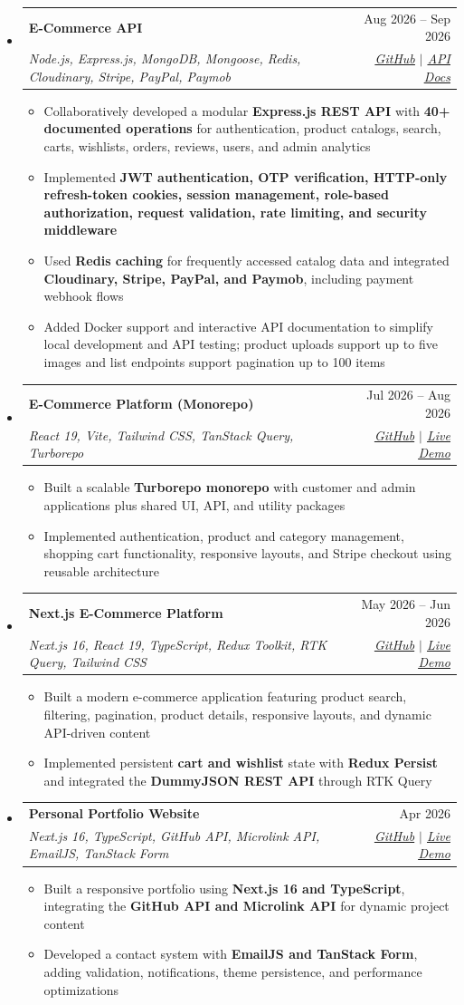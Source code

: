 \documentclass[letterpaper,11pt]{article}
\makeatletter
\newcommand{\resumeItem}[1]{ \item\small{ {#1 \vspace{-2pt}} } }
\newcommand{\resumeSubheading}[4]{
  \vspace{-2pt}\item
  \begin{tabular*}{0.97\textwidth}[t]{l@{\extracolsep{\fill}}r} \textbf{#1} & #2
  \\ \textit{\small#3} & \textit{\small #4} \\ \end{tabular*}\vspace{-7pt}
}
\newcommand{\resumeSubHeadingListStart}{\begin{itemize}[
    leftmargin=0.15in,
    label={}
  ]}
\newcommand{\resumeSubHeadingListEnd}{\end{itemize}}
\newcommand{\resumeItemListStart}{\begin{itemize}}
\newcommand{\resumeItemListEnd}{\end{itemize}\vspace{-5pt}}
\makeatother
\begin{document}
\resumeSubHeadingListStart
\resumeSubheading
{\textbf{E-Commerce API}}{Aug 2026 -- Sep 2026}
{\emph{
    Node.js, Express.js, MongoDB, Mongoose, Redis, Cloudinary, Stripe, PayPal,
    Paymob
  }}{\href{https://github.com/team-5-backend/e-commerce-api}{\underline{GitHub}}
  $|$
  \href{https://e-commerce-api-blond-eta.vercel.app/api/v1/docs}{\underline{
      API Docs
    }}}
\resumeItemListStart
\resumeItem{Collaboratively developed a modular \textbf{Express.js REST API}
  with \textbf{40+ documented operations} for authentication, product catalogs,
  search, carts, wishlists, orders, reviews, users, and admin analytics}
\resumeItem{Implemented
  \textbf{
    JWT authentication, OTP verification, HTTP-only refresh-token cookies,
    session management, role-based authorization, request validation, rate
    limiting, and security middleware
  }}
\resumeItem{Used \textbf{Redis caching} for frequently accessed catalog data and
  integrated \textbf{Cloudinary, Stripe, PayPal, and Paymob}, including payment
  webhook flows}
\resumeItem{Added Docker support and interactive API documentation to simplify
  local development and API testing; product uploads support up to five images
  and list endpoints support pagination up to 100 items}
\resumeItemListEnd
\resumeSubheading
{\textbf{E-Commerce Platform (Monorepo)}}{Jul 2026 -- Aug 2026}
{\emph{
    React 19, Vite, Tailwind CSS, TanStack Query, Turborepo
  }}{\href{https://github.com/team-9-frontend/e-commerce}{\underline{GitHub}}
  $|$
  \href{https://e-commerce-store-mu-eight.vercel.app/}{\underline{Live Demo}}}
\resumeItemListStart
\resumeItem{Built a scalable \textbf{Turborepo monorepo} with customer and admin
  applications plus shared UI, API, and utility packages}
\resumeItem{Implemented authentication, product and category management,
  shopping cart functionality, responsive layouts, and Stripe checkout using
  reusable architecture}
\resumeItemListEnd
\resumeSubheading
{\textbf{Next.js E-Commerce Platform}}{May 2026 -- Jun 2026}
{\emph{
    Next.js 16, React 19, TypeScript, Redux Toolkit, RTK Query, Tailwind CSS
  }}{\href{https://github.com/ziad-wdev/Store}{\underline{GitHub}} $|$
  \href{https://store-two-mu.vercel.app/}{\underline{Live Demo}}}
\resumeItemListStart
\resumeItem{Built a modern e-commerce application featuring product search,
  filtering, pagination, product details, responsive layouts, and dynamic
  API-driven content}
\resumeItem{Implemented persistent \textbf{cart and wishlist} state with
  \textbf{Redux Persist} and integrated the \textbf{DummyJSON REST API} through
  RTK Query}
\resumeItemListEnd
\resumeSubheading
{\textbf{Personal Portfolio Website}}{Apr 2026}
{\emph{
    Next.js 16, TypeScript, GitHub API, Microlink API, EmailJS, TanStack Form
  }}{\href{https://github.com/ziad-wdev/portfolio}{\underline{GitHub}} $|$
  \href{https://ziad-wdev.vercel.app/}{\underline{Live Demo}}}
\resumeItemListStart
  \resumeItem{Built a responsive portfolio using
    \textbf{Next.js 16 and TypeScript}, integrating the
    \textbf{GitHub API and Microlink API} for dynamic project content}
  \resumeItem{Developed a contact system with
    \textbf{EmailJS and TanStack Form}, adding validation, notifications, theme
    persistence, and performance optimizations}
  \resumeItemListEnd
\resumeSubHeadingListEnd

\end{document}
